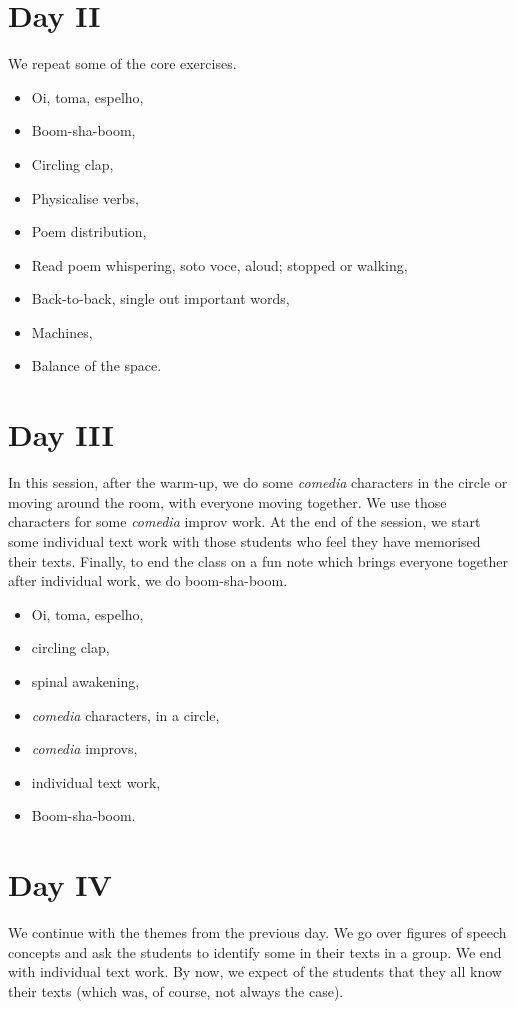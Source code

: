 \documentclass[article,twocolumn,twoside]{memoir}
\begin{document}
\section{Day II}

We repeat some of the core exercises.

\begin{itemize}
\item Oi, toma, espelho,
\item Boom-sha-boom,
\item Circling clap,
\item Physicalise verbs,
\item Poem distribution,
\item Read poem whispering, soto voce, aloud; stopped or walking,
\item Back-to-back, single out important words,
\item Machines,
\item Balance of the space.
\end{itemize}
\section{Day III}
In this session, after the warm-up, we do some \textit{comedia} characters in
the circle or moving around the room, with everyone moving together. We use
those characters for some \textit{comedia} improv work. At the end of the
session, we start some individual text work with those students who feel they
have memorised their texts. Finally, to end the class on a fun note which
brings everyone together after individual work, we do boom-sha-boom.

\begin{itemize}
\item Oi, toma, espelho,
\item circling clap,
\item spinal awakening,
\item \textit{comedia} characters, in a circle,
\item \textit{comedia} improvs,
\item individual text work,
\item Boom-sha-boom.
\end{itemize}
\section{Day IV}

We continue with the themes from the previous day. We go over figures of speech
concepts and ask the students to identify some in their texts in a group. We
end with individual text work. By now, we expect of the students that they all
know their texts (which was, of course, not always the case).
\end{document}
